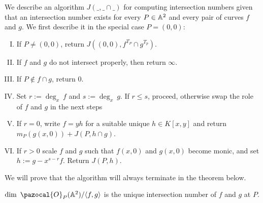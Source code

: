     \begin{remark}
        We describe an algorithm $J(\_,\_\cap \_)$ for computing intersection numbers given that an intersection number exists for every $P\in \mathbb{A}^2$ and every pair of curves $f$ and $g$. We first describe it in the special case $P=(0,0)$:
        \begin{enumerate}[(I)]
            \item If $P \neq (0,0)$, return $J((0,0), f^{T_P}\cap g^{T_p})$.
            \item If $f$ and $g$ do not intersect properly, then return $\infty$.
            \item If $P\notin f\cap g$, return $0$. 
            \item Set $r:= \deg_x \ f$ and $s:= \deg_x \ g$. If $r\leq s$, proceed, otherwise swap the role of $f$ and $g$ in the next steps
            \item If $r=0$, write $f=yh$ for a suitable unique $h\in K[x,y]$ and return $m_P(g(x,0))+J(P,h\cap g).$
            \item If $r>0$ scale $f$ and $g$ such that $f(x,0)$ and $g(x,0)$ become monic, and set $h:= g-x^{s-r}f$. Return $J(P,h)$.
        \end{enumerate}
        We will prove that the algorithm will always terminate in the theorem below. 
    \end{remark}
    \begin{theorem}
        $\dim\ \pazocal{O}_P(\A^2)/\langle f,g\rangle$ is the unique intersection number of $f$ and $g$ at $P$.
    \end{theorem}
